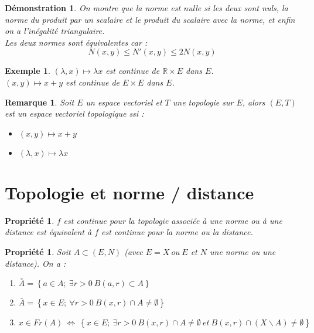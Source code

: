 \documentclass[a4paper, oneside]{report}
\theoremstyle{break}
\newtheorem{propr}[thm]{Propriété}
\newtheorem{exem}[thm]{Exemple}
\newtheorem*{demo}{Démonstration}
\newtheorem{remar}[thm]{Remarque}
\newcommand{\x}{\times}
\newcommand{\R}{\mathbb{R}}
\newcommand{\ev}{espace vectoriel }
\newcommand{\cerc}[1]{\overset{\circ}{#1}}
\begin{document}
\begin{demo}
On montre que la norme est nulle si les deux sont nuls, la norme du produit par un scalaire et le produit du scalaire avec la norme, et enfin on a l'inégalité triangulaire.\\
Les deux normes sont équivalentes car :
$$N(x,y) \leq N'(x,y) \leq 2N(x,y)$$
\end{demo}



\begin{exem}
$(\lambda , x)\mapsto \lambda x$ est continue de $\R \x E$ dans $E$.\\
$(x , y)\mapsto x+y$ est continue de $E \x E$ dans $E$.\\
\end{exem}


\begin{remar}
Soit $E$ un \ev et $T$ une topologie sur $E$, alors $(E,T)$ est un \ev topologique ssi :
\begin{itemize}
\item $(x,y) \mapsto x+y$
\item $(\lambda , x) \mapsto \lambda x$
\end{itemize}
\end{remar}


\section{Topologie et norme / distance}

\begin{propr}
$f$ est continue pour la topologie associée à une norme ou à une distance est équivalent à $f$ est continue pour la norme ou la distance.
\end{propr}


\begin{propr}
Soit $A \subset (E,N)$ (avec $E=X~ou~E$ et $N$ une norme ou une distance). On a :
\begin{enumerate}
\item $\cerc{A} = \left\{a \in A;~\exists r >0~B(a,r)\subset A \right\}$
\item $\bar{A} = \left\{x\in E;~\forall r>0~ B(x,r) \cap A \neq \emptyset \right\}$
\item $x\in Fr(A)~\Leftrightarrow~\left\{x\in E;~ \exists r>0~ B(x,r)\cap A\neq \emptyset~et~ B(x,r)\cap (X\backslash A)\neq \emptyset \right\}$
\end{enumerate}
\end{propr}
\end{document}
